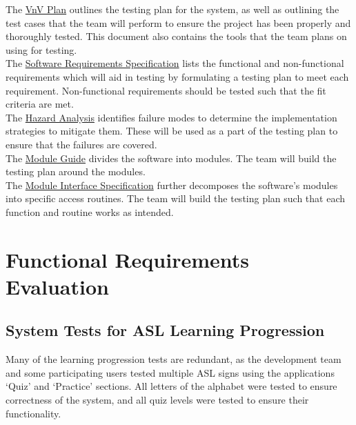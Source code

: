 \documentclass[12pt, titlepage]{article}
\begin{document}
\noindent The \href{https://github.com/stanreee/sign-language-learning/blob/main/docs/VnVPlan/VnVPlan.pdf}{VnV Plan} outlines the testing plan for the system, as well as outlining the test cases that the team will perform to ensure the project has been properly and thoroughly tested. This document also contains the tools that the team plans on using for testing.\\

\noindent The \href{https://github.com/stanreee/sign-language-learning/blob/main/docs/SRS/SRS.pdf}{Software Requirements Specification} lists the functional and non-functional requirements which will aid in testing by formulating a testing plan to meet each requirement. Non-functional requirements should be tested such that the fit criteria are met.\\

\noindent The \href{https://github.com/stanreee/sign-language-learning/blob/main/docs/HazardAnalysis/HazardAnalysis.pdf}{Hazard Analysis} identifies failure modes to determine the implementation strategies to mitigate them. These will be used as a part of the testing plan to ensure that the failures are covered.\\

\noindent The \href{https://github.com/stanreee/sign-language-learning/blob/main/docs/Design/SoftArchitecture/MG.pdf}{Module Guide} divides the software into modules. The team will build the testing plan around the modules.\\

\noindent The \href{https://github.com/stanreee/sign-language-learning/blob/main/docs/Design/SoftDetailedDes/MIS.pdf}{Module Interface Specification} further decomposes the software's modules into specific access routines. The team will build the testing plan such that each function and routine works as intended.

\section{Functional Requirements Evaluation}

\subsection{System Tests for ASL Learning Progression}

Many of the learning progression tests are redundant, as the development team and some participating users tested multiple ASL signs using the applications `Quiz' and `Practice' sections. All letters of the alphabet were tested to ensure correctness of the system, and all quiz levels were tested to ensure their functionality. 
\end{document}
